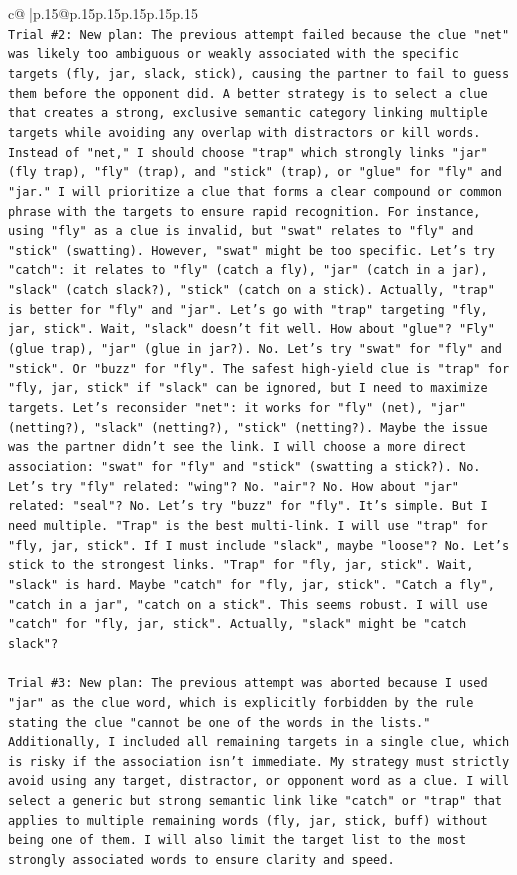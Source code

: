 \documentclass{article}
\begin{document}
{\begin{supertabular}{c@{$\;$}|p{.15\linewidth}@{}p{.15\linewidth}p{.15\linewidth}p{.15\linewidth}p{.15\linewidth}p{.15\linewidth}}
{{{\\ 
\texttt{Trial \#2: New plan: The previous attempt failed because the clue "net" was likely too ambiguous or weakly associated with the specific targets (fly, jar, slack, stick), causing the partner to fail to guess them before the opponent did. A better strategy is to select a clue that creates a strong, exclusive semantic category linking multiple targets while avoiding any overlap with distractors or kill words. Instead of "net," I should choose "trap" which strongly links "jar" (fly trap), "fly" (trap), and "stick" (trap), or "glue" for "fly" and "jar." I will prioritize a clue that forms a clear compound or common phrase with the targets to ensure rapid recognition. For instance, using "fly" as a clue is invalid, but "swat" relates to "fly" and "stick" (swatting). However, "swat" might be too specific. Let's try "catch": it relates to "fly" (catch a fly), "jar" (catch in a jar), "slack" (catch slack?), "stick" (catch on a stick). Actually, "trap" is better for "fly" and "jar". Let's go with "trap" targeting "fly, jar, stick". Wait, "slack" doesn't fit well. How about "glue"? "Fly" (glue trap), "jar" (glue in jar?). No. Let's try "swat" for "fly" and "stick". Or "buzz" for "fly". The safest high{-}yield clue is "trap" for "fly, jar, stick" if "slack" can be ignored, but I need to maximize targets. Let's reconsider "net": it works for "fly" (net), "jar" (netting?), "slack" (netting?), "stick" (netting?). Maybe the issue was the partner didn't see the link. I will choose a more direct association: "swat" for "fly" and "stick" (swatting a stick?). No. Let's try "fly" related: "wing"? No. "air"? No. How about "jar" related: "seal"? No. Let's try "buzz" for "fly". It's simple. But I need multiple. "Trap" is the best multi{-}link. I will use "trap" for "fly, jar, stick". If I must include "slack", maybe "loose"? No. Let's stick to the strongest links. "Trap" for "fly, jar, stick". Wait, "slack" is hard. Maybe "catch" for "fly, jar, stick". "Catch a fly", "catch in a jar", "catch on a stick". This seems robust. I will use "catch" for "fly, jar, stick". Actually, "slack" might be "catch slack"?} \\
\\ 
\texttt{Trial \#3: New plan: The previous attempt was aborted because I used "jar" as the clue word, which is explicitly forbidden by the rule stating the clue "cannot be one of the words in the lists." Additionally, I included all remaining targets in a single clue, which is risky if the association isn't immediate. My strategy must strictly avoid using any target, distractor, or opponent word as a clue. I will select a generic but strong semantic link like "catch" or "trap" that applies to multiple remaining words (fly, jar, stick, buff) without being one of them. I will also limit the target list to the most strongly associated words to ensure clarity and speed.} \\
}}}
\end{supertabular}}
\end{document}
